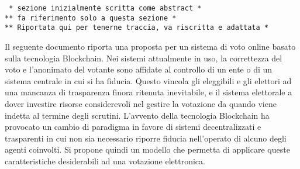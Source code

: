 \begin{center}
	\texttt{
	* sezione inizialmente scritta come abstract * \\
	** fa riferimento solo a questa sezione * \\
	** Riportata qui per tenerne traccia, va riscritta e adattata *}
\end{center}
Il seguente documento riporta una proposta per un sistema di voto online basato sulla tecnologia Blockchain. Nei sistemi attualmente in uso, la correttezza del voto e l’anonimato del votante sono affidate al controllo di un ente o di un sistema centrale in cui si ha fiducia. Questo vincola gli eleggibili e gli elettori ad una mancanza di trasparenza finora ritenuta inevitabile, e il sistema elettorale a dover investire risorse considerevoli nel gestire la votazione da quando viene indetta al termine degli scrutini. L’avvento della tecnologia Blockchain ha provocato un cambio di paradigma in favore di sistemi decentralizzati e trasparenti in cui non sia necessario riporre fiducia nell’operato di alcuno degli agenti coinvolti. Si propone quindi un modello che permetta di applicare queste caratteristiche desiderabili ad una votazione elettronica.